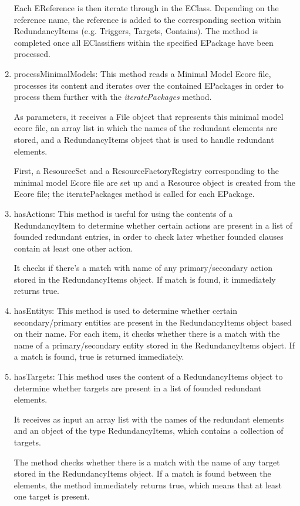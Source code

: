 \begin{enumerate}
	 Each EReference is then iterate through in the EClass. Depending on the reference name, the reference is added to the corresponding section within RedundancyItems (e.g. Triggers, Targets, Contains). The method is completed once all EClassifiers within the specified EPackage have been processed.
	
	\item processMinimalModels: This method reads a Minimal Model Ecore file, processes its content and iterates over the contained EPackages in order to process them further with the \textit{iteratePackages} method. 
	
	As parameters, it receives a File object that represents this minimal model ecore file, an array list in which the names of the redundant elements are stored, and a RedundancyItems object that is used to handle redundant elements. 
	
	First, a ResourceSet and a ResourceFactoryRegistry corresponding to the minimal model Ecore file are set up and a Resource object is created from the Ecore file; the iteratePackages method is called for each EPackage.
	
	\item hasActions: This method is useful for using the contents of a RedundancyItem to determine whether certain actions are present in a list of founded redundant entries, in order to check later whether founded clauses contain at least one other action.
	
	It checks if there's a match with name of any primary/secondary action stored in the RedundancyItems object. If match is found, it immediately returns true.
	
	\item hasEntitys: This method is used to determine whether certain secondary/primary entities  are present in the RedundancyItems object based on their name. For each item, it checks whether there is a match with the name of a primary/secondary entity stored in the RedundancyItems object. If a match is found, true is returned immediately.
	
	\item hasTargets: This method uses the content of a RedundancyItems object to determine whether targets are present in a list of founded redundant elements.
	
	It receives as input an array list with the names of the redundant elements and an object of the type RedundancyItems, which contains a collection of targets.
	
	The method checks whether there is a match with the name of any target stored in the RedundancyItems object. If a match is found between the elements, the method immediately returns true, which means that at least one target is present.
	

\end{enumerate}
